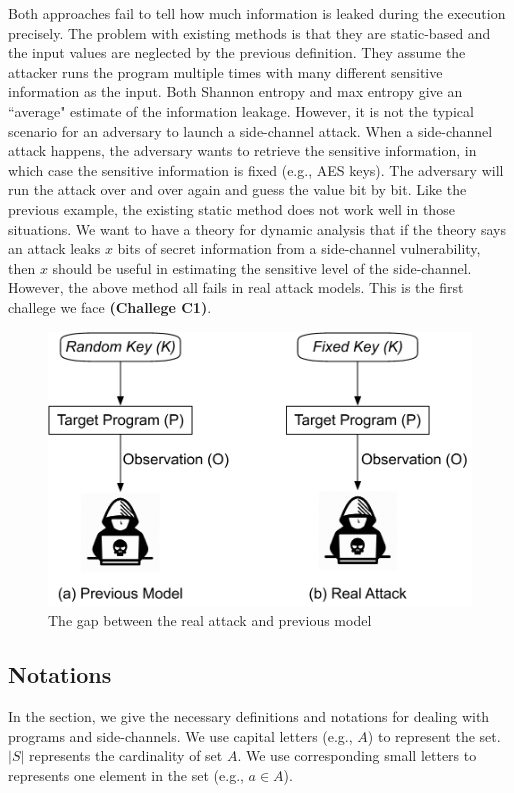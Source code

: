 Both approaches fail to tell how 
much information is leaked during the execution precisely.
The problem with existing methods is that they are static-based and the 
input values are neglected by the previous definition. 
They assume the attacker runs the program multiple times with many different sensitive 
information as the input. Both Shannon entropy and max entropy give an ``average" 
estimate of the information leakage. However, it is not the typical scenario for an adversary to 
launch a side-channel attack. When a side-channel attack happens, the adversary wants 
to retrieve the sensitive information, in which case the sensitive information is fixed (e.g., AES keys). 
The adversary will run the attack over and over again and guess the value bit by bit. Like the 
previous example, the existing static method does not work well in those situations.
We want to have a theory for dynamic analysis that if the theory says 
an attack leaks $x$ bits of secret information from a side-channel vulnerability,
then $x$ should be useful in estimating the sensitive level of the side-channel.
However, the above method all fails in real attack models.
This is the first challege we face \textbf{(Challege C1)}.

\begin{figure}
  \centering
   \includegraphics[width=.8\columnwidth]{./figures/RA.pdf}
   \caption{The gap between the real attack and previous model}
\end{figure}


\subsection{Notations}
In the section, we give the necessary definitions and notations for dealing 
with programs and side-channels. We use capital letters (e.g., $A$) to represent 
the set. $|S|$ represents the cardinality of set $A$. We use corresponding small letters
to represents one element in the set (e.g., $a \in A$).

